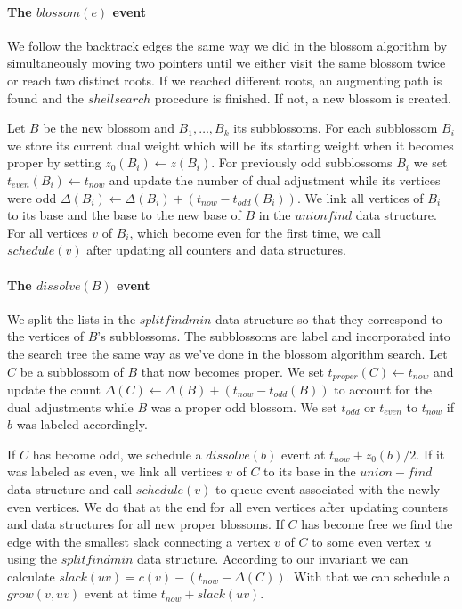\paragraph*{The $blossom(e)$ event}

We follow the backtrack edges the same way we did in the blossom algorithm by simultaneously moving two pointers until we either visit the same blossom twice or reach two distinct roots. If we reached different roots, an augmenting path is found and the $shellsearch$ procedure is finished. If not, a new blossom is created. 

Let $B$ be the new blossom and $B_1, \dots, B_k$ its subblossoms.
For each subblossom $B_i$ we store its current dual weight which will be its starting weight when it becomes proper by setting $z_0(B_i) \gets z(B_i)$. For previously odd subblossoms $B_i$ we set $t_{even}(B_i) \gets t_{now}$ and update the number of dual adjustment while its vertices were odd $\Delta(B_i) \gets \Delta(B_i) + (t_{now} - t_{odd}(B_i))$. We link all vertices of $B_i$ to its base and the base to the new base of $B$ in the $unionfind$ data structure. For all vertices $v$ of $B_i$, which become even for the first time, we call $schedule(v)$ after updating all counters and data structures.

\paragraph*{The $dissolve(B)$ event} 

We split the lists in the $splitfindmin$ data structure so that they correspond to the vertices of $B$'s subblossoms. The subblossoms are label and incorporated into the search tree the same way as we've done in the blossom algorithm search. Let $C$ be a subblossom of $B$ that now becomes proper. We set $t_{proper}(C) \gets t_{now}$ and update the count $\Delta(C) \gets \Delta(B) + (t_{now} - t_{odd}(B))$ to account for the dual adjustments while $B$ was a proper odd blossom. We set $t_{odd}$ or $t_{even}$ to $t_{now}$ if $b$ was labeled accordingly. 

If $C$ has become odd, we schedule a $dissolve(b)$ event at $t_{now} + z_0(b) / 2$. If it was labeled as even, we link all vertices $v$ of $C$ to its base in the $union-find$ data structure and call $schedule(v)$ to queue event associated with the newly even vertices. We do that at the end for all even vertices after updating counters and data structures for all new proper blossoms. If $C$ has become free we find the edge with the smallest slack connecting a vertex $v$ of $C$ to some even vertex $u$ using the $splitfindmin$ data structure. According to our invariant we can calculate $slack(uv) = c(v) - (t_{now} - \Delta(C))$. With that we can schedule a $grow(v, uv)$ event at time $t_{now} + slack(uv)$. 


